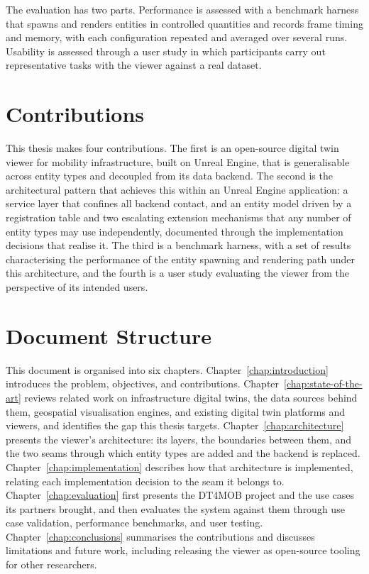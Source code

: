 The evaluation has two parts. Performance is assessed with a benchmark harness that spawns and renders entities in controlled quantities and records frame timing and memory, with each configuration repeated and averaged over several runs. Usability is assessed through a user study in which participants carry out representative tasks with the viewer against a real dataset.

\section{Contributions}
\label{sec:contributions}

This thesis makes four contributions. The first is an open-source digital twin viewer for mobility infrastructure, built on Unreal Engine, that is generalisable across entity types and decoupled from its data backend. The second is the architectural pattern that achieves this within an Unreal Engine application: a service layer that confines all backend contact, and an entity model driven by a registration table and two escalating extension mechanisms that any number of entity types may use independently, documented through the implementation decisions that realise it. The third is a benchmark harness, with a set of results characterising the performance of the entity spawning and rendering path under this architecture, and the fourth is a user study evaluating the viewer from the perspective of its intended users.

\section{Document Structure}
\label{sec:structure}

This document is organised into six chapters. Chapter~\ref{chap:introduction} introduces the problem, objectives, and contributions. Chapter~\ref{chap:state-of-the-art} reviews related work on infrastructure digital twins, the data sources behind them, geospatial visualisation engines, and existing digital twin platforms and viewers, and identifies the gap this thesis targets. Chapter~\ref{chap:architecture} presents the viewer's architecture: its layers, the boundaries between them, and the two seams through which entity types are added and the backend is replaced. Chapter~\ref{chap:implementation} describes how that architecture is implemented, relating each implementation decision to the seam it belongs to. Chapter~\ref{chap:evaluation} first presents the DT4MOB project and the use cases its partners brought, and then evaluates the system against them through use case validation, performance benchmarks, and user testing. Chapter~\ref{chap:conclusions} summarises the contributions and discusses limitations and future work, including releasing the viewer as open-source tooling for other researchers.
